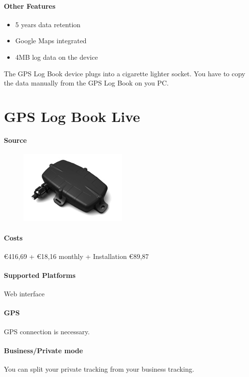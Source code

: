 \paragraph{Other Features}
\begin{itemize}
\item 5 years data retention 
\item Google Maps integrated
\item 4MB log data on the device
\end{itemize}
The GPS Log Book device plugs into a cigarette lighter socket. You have to copy the data manually from the GPS Log Book on you PC.
\newpage

\section{GPS Log Book Live}
\paragraph{Source} 
\begin{figure}
  \begin{center}
    \includegraphics[width=0.48\textwidth]{GPSlogbooklive!}
  \end{center}
\end{figure}
\paragraph{Costs}\euro 416,69 + \euro 18,16 monthly + Installation \euro 89,87 
\paragraph{Supported Platforms} Web interface
\paragraph{GPS} GPS connection is necessary.
\paragraph{Business/Private mode}You can split your private tracking from your business tracking.
